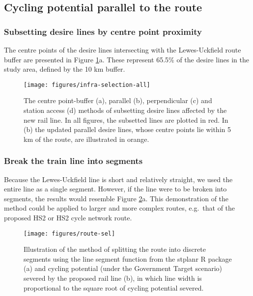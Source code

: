 \documentclass[11pt]{article}
\begin{document}
\subsection{Cycling potential parallel to the
route}\label{cycling-potential-parallel-to-the-route}

\subsubsection{Subsetting desire lines by centre point
proximity}\label{subsetting-desire-lines-by-centre-point-proximity}

The centre points of the desire lines intersecting with the
Lewes-Uckfield route buffer are presented in Figure
\ref{fig:metafigure}a. These represent 65.5\% of the desire lines in the
study area, defined by the 10 km buffer.

\begin{figure}

{\centering \texttt{[image: figures/infra-selection-all]}

}

\caption{The centre point-buffer (a), parallel (b), perpendicular (c) and station access (d) methods of subsetting desire lines affected by the new rail line. In all figures, the subsetted lines are plotted in red. In (b) the updated parallel desire lines, whose centre points lie within 5 km of the route, are illustrated in orange.}\label{fig:metafigure}
\end{figure}

\subsubsection{Break the train line into
segments}\label{break-the-train-line-into-segments}

Because the Lewes-Uckfield line is short and relatively straight, we
used the entire line as a single segment. However, if the line were to
be broken into segments, the results would resemble Figure
\ref{fig:segs}a. This demonstration of the method could be applied to
larger and more complex routes, e.g.~that of the proposed HS2 or HS2
cycle network route.

\begin{figure}

{\centering \texttt{[image: figures/route-sel]}

}

\caption{Illustration of the method of splitting the route into discrete segments using the line segment function from the stplanr R package (a) and cycling potential (under the Government Target scenario) severed by the proposed rail line (b), in which line width is proportional to the square root of cycling potential severed.}\label{fig:segs}
\end{figure}
\end{document}
